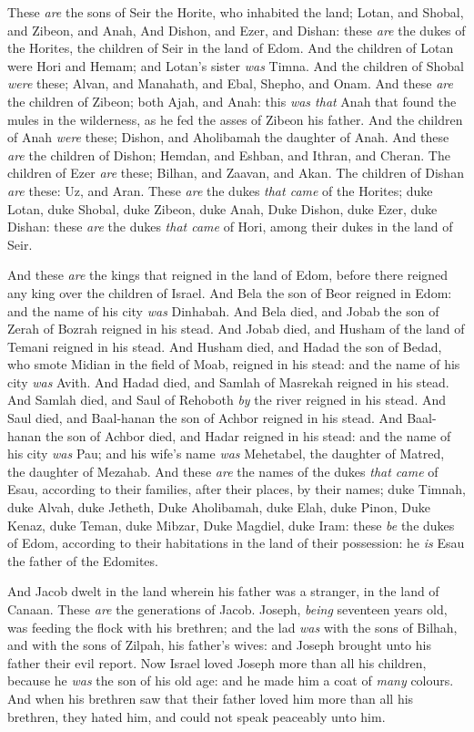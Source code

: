 \documentclass[11pt,letterpaper,oneside]{memoir}
\begin{document}
These \emph{are} the sons of Seir the Horite, who inhabited the land;
Lotan, and Shobal, and Zibeon, and Anah, And Dishon, and Ezer, and
Dishan: these \emph{are} the dukes of the Horites, the children of Seir
in the land of Edom. And the children of Lotan were Hori and Hemam; and
Lotan's sister \emph{was} Timna. And the children of Shobal \emph{were}
these; Alvan, and Manahath, and Ebal, Shepho, and Onam. And these
\emph{are} the children of Zibeon; both Ajah, and Anah: this \emph{was
that} Anah that found the mules in the wilderness, as he fed the asses
of Zibeon his father. And the children of Anah \emph{were} these;
Dishon, and Aholibamah the daughter of Anah. And these \emph{are} the
children of Dishon; Hemdan, and Eshban, and Ithran, and Cheran. The
children of Ezer \emph{are} these; Bilhan, and Zaavan, and Akan. The
children of Dishan \emph{are} these: Uz, and Aran. These \emph{are} the
dukes \emph{that came} of the Horites; duke Lotan, duke Shobal, duke
Zibeon, duke Anah, Duke Dishon, duke Ezer, duke Dishan: these \emph{are}
the dukes \emph{that came} of Hori, among their dukes in the land of
Seir.

And these \emph{are} the kings that reigned in the land of Edom, before
there reigned any king over the children of Israel. And Bela the son of
Beor reigned in Edom: and the name of his city \emph{was} Dinhabah. And
Bela died, and Jobab the son of Zerah of Bozrah reigned in his stead.
And Jobab died, and Husham of the land of Temani reigned in his stead.
And Husham died, and Hadad the son of Bedad, who smote Midian in the
field of Moab, reigned in his stead: and the name of his city \emph{was}
Avith. And Hadad died, and Samlah of Masrekah reigned in his stead. And
Samlah died, and Saul of Rehoboth \emph{by} the river reigned in his
stead. And Saul died, and Baal-hanan the son of Achbor reigned in his
stead. And Baal-hanan the son of Achbor died, and Hadar reigned in his
stead: and the name of his city \emph{was} Pau; and his wife's name
\emph{was} Mehetabel, the daughter of Matred, the daughter of Mezahab.
And these \emph{are} the names of the dukes \emph{that came} of Esau,
according to their families, after their places, by their names; duke
Timnah, duke Alvah, duke Jetheth, Duke Aholibamah, duke Elah, duke
Pinon, Duke Kenaz, duke Teman, duke Mibzar, Duke Magdiel, duke Iram:
these \emph{be} the dukes of Edom, according to their habitations in the
land of their possession: he \emph{is} Esau the father of the Edomites.

And Jacob dwelt in the land wherein his father was a stranger, in the
land of Canaan. These \emph{are} the generations of Jacob. Joseph,
\emph{being} seventeen years old, was feeding the flock with his
brethren; and the lad \emph{was} with the sons of Bilhah, and with the
sons of Zilpah, his father's wives: and Joseph brought unto his father
their evil report. Now Israel loved Joseph more than all his children,
because he \emph{was} the son of his old age: and he made him a coat of
\emph{many} colours. And when his brethren saw that their father loved
him more than all his brethren, they hated him, and could not speak
peaceably unto him.
\end{document}
